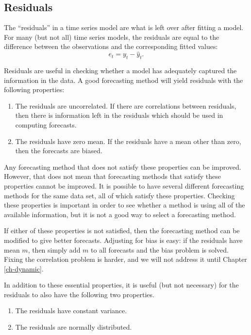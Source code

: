 \documentclass[]{book}
\providecommand{\tightlist}{%
  \setlength{\itemsep}{0pt}\setlength{\parskip}{0pt}}
\begin{document}
\hypertarget{residuals-1}{%
\subsection*{Residuals}\label{residuals-1}}

The ``residuals'' in a time series model are what is left over after fitting a model. For many (but not all) time series models, the residuals are equal to the difference between the observations and the corresponding fitted values:
\[
  e_{t} = y_{t}-\hat{y}_{t}.
\]

Residuals are useful in checking whether a model has adequately captured the information in the data. A good forecasting method will yield residuals with the following properties:

\begin{enumerate}
\def\labelenumi{\arabic{enumi}.}
\tightlist
\item
  The residuals are uncorrelated. If there are correlations between residuals, then there is information left in the residuals which should be used in computing forecasts.
\item
  The residuals have zero mean. If the residuals have a mean other than zero, then the forecasts are biased.
\end{enumerate}

Any forecasting method that does not satisfy these properties can be improved. However, that does not mean that forecasting methods that satisfy these properties cannot be improved. It is possible to have several different forecasting methods for the same data set, all of which satisfy these properties. Checking these properties is important in order to see whether a method is using all of the available information, but it is not a good way to select a forecasting method.

If either of these properties is not satisfied, then the forecasting method can be modified to give better forecasts. Adjusting for bias is easy: if the residuals have mean \(m\), then simply add \(m\) to all forecasts and the bias problem is solved. Fixing the correlation problem is harder, and we will not address it until Chapter \ref{ch-dynamic}.

In addition to these essential properties, it is useful (but not necessary) for the residuals to also have the following two properties.

\begin{enumerate}
\def\labelenumi{\arabic{enumi}.}
\setcounter{enumi}{2}
\tightlist
\item
  The residuals have constant variance.
\item
  The residuals are normally distributed.
\end{enumerate}
\end{document}
